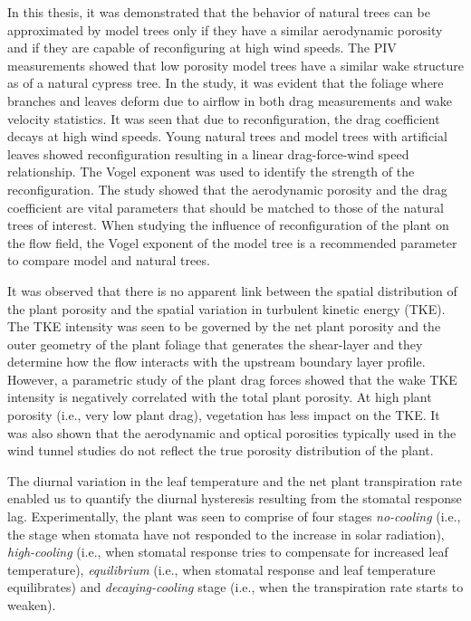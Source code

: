 In this thesis, it was demonstrated that the behavior of natural trees can be approximated by model trees only if they have a similar aerodynamic porosity and if they are capable of reconfiguring at high wind speeds. The PIV measurements showed that low porosity model trees have a similar wake structure as of a natural cypress tree. In the study, it was evident that the foliage where branches and leaves deform due to airflow in both drag measurements and wake velocity statistics. It was seen that due to reconfiguration, the drag coefficient decays at high wind speeds. Young natural trees and model trees with artificial leaves showed reconfiguration resulting in a linear drag-force-wind speed relationship. The Vogel exponent was used to identify the strength of the reconfiguration. The study showed that the aerodynamic porosity and the drag coefficient are vital parameters that should be matched to those of the natural trees of interest. When studying the influence of reconfiguration of the plant on the flow field, the Vogel exponent of the model tree is a recommended parameter to compare model and natural trees.

It was observed that there is no apparent link between the spatial distribution of the plant porosity and the spatial variation in turbulent kinetic energy (TKE). The TKE intensity was seen to be governed by the net plant porosity and the outer geometry of the plant foliage that generates the shear-layer and they determine how the flow interacts with the upstream boundary layer profile. However, a parametric study of the plant drag forces showed that the wake TKE intensity is negatively correlated with the total plant porosity. At high plant porosity (i.e., very low plant drag), vegetation has less impact on the TKE. It was also shown that the aerodynamic and optical porosities typically used in the wind tunnel studies do not reflect the true porosity distribution of the plant. 

The diurnal variation in the leaf temperature and the net plant transpiration rate enabled us to quantify the diurnal hysteresis resulting from the stomatal response lag. Experimentally, the plant was seen to comprise of four stages \textit{no-cooling} (i.e., the stage when stomata have not responded to the increase in solar radiation),\textit{ high-cooling} (i.e., when stomatal response tries to compensate for increased leaf temperature), \textit{equilibrium} (i.e., when stomatal response and leaf temperature equilibrates) and \textit{decaying-cooling} stage (i.e., when the transpiration rate starts to weaken). 

